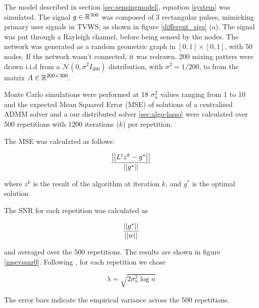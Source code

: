 The model described in section \eqref{sec:sensingmodel}, equation \eqref{system} was simulated. The signal \(g \in {\mathbb{R}}^{300} \) was composed of 3 rectangular pulses, mimicking primary user signals in TVWS, as shown in figure \eqref{different_sigs} (a). The signal was put through a Rayleigh channel, before being sensed by the nodes. The network was generated as a random geometric graph in \([0,1] \times [0,1]\), with 50 nodes. If the network wasn't connected, it was redrawn. 200 mixing patters were drawn i.i.d from a \(\mathcal{N}\left(0, \sigma^2 I_{300} \right) \) distribution, with \(\sigma^2 = 1/200\), to from the matrix \(A\in  {\mathbb{R}}^{200 \times 300}\).

Monte Carlo simulations were performed at 18 \(\sigma^2_n\) values ranging from 1 to 10 and the expected Mean Squared Error (MSE) of solutions of a centralised ADMM solver and a our distributed solver \ref{sec:algo-lasso} were calculated over 500 repetitions with 1200 iterations (\(k\)) per repetition.

The MSE was calculated as follows:

\begin{equation}
\frac{\left|\left|L^tz^k - g^*\right|\right|}{\left|\left|g^*\right|\right|}
\end{equation}

where \(z^k\) is the result of the algorithm at iteration \(k\), and \(g^*\) is the optimal solution.

The SNR for each repetition was calculated as

\begin{equation}
\frac{\left|\left|g^*\right|\right|}{\left|\left|w\right|\right|}
\end{equation}

and averaged over the 500 repetitions. The results are shown in figure \eqref{msevssnr0}. Following \cite{Chen1998}, for each repetition we chose 

\begin{equation}
\lambda = \sqrt{2\sigma^2_n\log{n}}
\end{equation}

The error bars indicate the empirical variance across the 500 repetitions.

